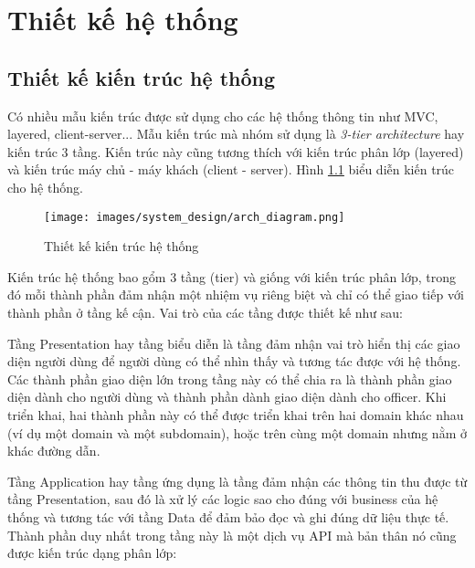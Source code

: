\documentclass[../main.tex]{subfiles}
\begin{document}
	\justifying


	\chapter{Thiết kế hệ thống}
	\label{chap:system_design}


	\section{Thiết kế kiến trúc hệ thống}

	Có nhiều mẫu kiến trúc được sử dụng cho các hệ thống thông tin như MVC, layered, client-server... Mẫu kiến trúc mà
	nhóm sử dụng là \emph{3-tier architecture} hay kiến trúc 3 tầng. Kiến trúc này cũng tương thích với kiến trúc phân lớp
	(layered) và kiến trúc máy chủ - máy khách (client - server). Hình \ref{fig:arch_diagram} biểu diễn kiến trúc cho hệ 
	thống.

	\begin{figure}[ht]
		\centering
		\texttt{[image: images/system\_design/arch\_diagram.png]}
		\caption{Thiết kế kiến trúc hệ thống}
		\label{fig:arch_diagram}
	\end{figure}

	Kiến trúc hệ thống bao gổm 3 tầng (tier) và giống với kiến trúc phân lớp, trong đó mỗi thành phần đảm nhận một nhiệm
	vụ riêng biệt và chỉ có thể giao tiếp với thành phần ở tầng kế cận. Vai trò của các tầng được thiết kế như sau:

	Tầng Presentation hay tầng biểu diễn là tầng đảm nhận vai trò hiển thị các giao diện người dùng để người dùng có thể
	nhìn thấy và tương tác được với hệ thống. Các thành phần giao diện lớn trong tầng này có thể chia ra là thành phần
	giao diện dành cho người dùng và thành phần dành giao diện dành cho officer. Khi triển khai, hai thành phần này có thể
	được triển khai trên hai domain khác nhau (ví dụ một domain và một subdomain), hoặc trên cùng một domain nhưng nằm ở
	khác đường dẫn.

	Tầng Application hay tầng ứng dụng là tầng đảm nhận các thông tin thu được từ tầng Presentation, sau đó là xử lý các
	logic sao cho đúng với business của hệ thống và tương tác với tầng Data để đảm bảo đọc và ghi đúng dữ liệu thực tế.
	Thành phần duy nhất trong tầng này là một dịch vụ API mà bản thân nó cũng được kiến trúc dạng phân lớp:
\end{document}

